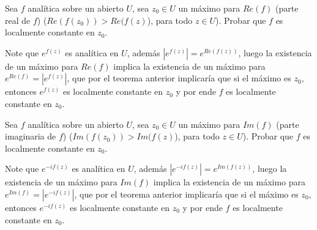 \begin{homeworkProblem}
  Sea $f$ analítica sobre un abierto $U$, sea $z_0\in U$ un máximo para $Re(f)$  (parte real de $f$) ($Re(f(z_0)) > Re(f(z)$), para todo $z \in U$). Probar que $f$ es localmente constante en $z_0$.
  \begin{solution}
    Note que $e^{f(z)}$ es analítica en $U$, además $|e^{f(z)}|=e^{Re(f(z))}$, luego la existencia de un máximo para $Re(f)$ implica la existencia de un máximo para $e^{Re(f)}=|e^{f(z)}|$, que por el teorema anterior implicaría que si el máximo es $z_0$, entonces $e^{f(z)}$ es localmente constante en $z_0$ y por ende $f$ es localmente constante en $z_0$.
    \demostrado
  \end{solution}
\end{homeworkProblem}
\begin{homeworkProblem}
  Sea $f$ analítica sobre un abierto $U$, sea $z_0\in U$ un máximo para $Im(f)$  (parte imaginaria de $f$) ($Im(f(z_0)) > Im(f(z)$), para todo $z \in U$). Probar que $f$ es localmente constante en $z_0$.
  \begin{solution}
    Note que $e^{-if(z)}$ es analítica en $U$, además $|e^{-if(z)}|=e^{Im(f(z))}$, luego la existencia de un máximo para $Im(f)$ implica la existencia de un máximo para $e^{Im(f)}=|e^{-if(z)}|$, que por el teorema anterior implicaría que si el máximo es $z_0$, entonces $e^{-if(z)}$ es localmente constante en $z_0$ y por ende $f$ es localmente constante en $z_0$.
    \demostrado
  \end{solution}
\end{homeworkProblem}
